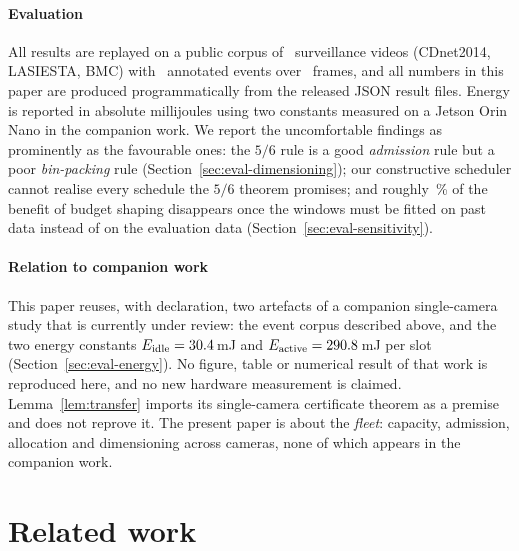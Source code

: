 \documentclass[preprint,review,12pt]{elsarticle}
\theoremstyle{definition}
\begin{document}
\paragraph{Evaluation}
All results are replayed on a public corpus of \numVideos\ surveillance videos
(CDnet2014, LASIESTA, BMC) with \numEvents\ annotated events over \numFrames\ frames, and all
numbers in this paper are produced programmatically from the released JSON result files. Energy
is reported in absolute millijoules using two constants measured on a Jetson Orin Nano in the
companion work. We report the uncomfortable findings as prominently as the favourable ones: the
$5/6$ rule is a good \emph{admission} rule but a poor \emph{bin-packing} rule
(Section~\ref{sec:eval-dimensioning}); our constructive scheduler cannot realise every schedule
the $5/6$ theorem promises; and roughly \numOracleShare\,\% of the benefit of budget shaping
disappears once the windows must be fitted on past data instead of on the evaluation data
(Section~\ref{sec:eval-sensitivity}).

\paragraph{Relation to companion work}
This paper reuses, with declaration, two artefacts of a companion single-camera study that is
currently under review: the event corpus described above, and the two energy constants
$E_{\mathrm{idle}}=30.4$\,mJ and $E_{\mathrm{active}}=290.8$\,mJ per slot
(Section~\ref{sec:eval-energy}). No figure, table or numerical result of that work is reproduced
here, and no new hardware measurement is claimed. Lemma~\ref{lem:transfer} imports its
single-camera certificate theorem as a premise and does not reprove it. The present paper is
about the \emph{fleet}: capacity, admission, allocation and dimensioning across cameras, none of
which appears in the companion work.

\section{Related work}\label{sec:related}
\end{document}
